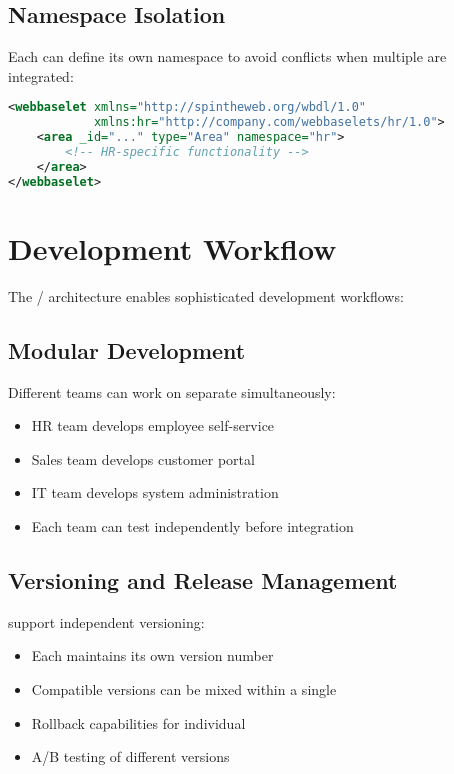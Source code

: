 \subsection{Namespace Isolation}

Each \webbaselet{} can define its own namespace to avoid conflicts when multiple  are integrated:

\begin{lstlisting}[language=XML,caption={Webbaselet with Namespace}]
<webbaselet xmlns="http://spintheweb.org/wbdl/1.0"
			xmlns:hr="http://company.com/webbaselets/hr/1.0">
	<area _id="..." type="Area" namespace="hr">
		<!-- HR-specific functionality -->
	</area>
</webbaselet>
\end{lstlisting}

\section{Development Workflow}
\label{sec:development-workflow}

The \webbase{}/\webbaselet{} architecture enables sophisticated development workflows:

\subsection{Modular Development}

Different teams can work on separate  simultaneously:
\begin{itemize}
\item HR team develops employee self-service \webbaselet{}
\item Sales team develops customer portal \webbaselet{}
\item IT team develops system administration \webbaselet{}
\item Each team can test independently before integration
\end{itemize}

\subsection{Versioning and Release Management}

 support independent versioning:
\begin{itemize}
\item Each \webbaselet{} maintains its own version number
\item Compatible versions can be mixed within a single \webbase{}
\item Rollback capabilities for individual 
\item A/B testing of different \webbaselet{} versions
\end{itemize}

